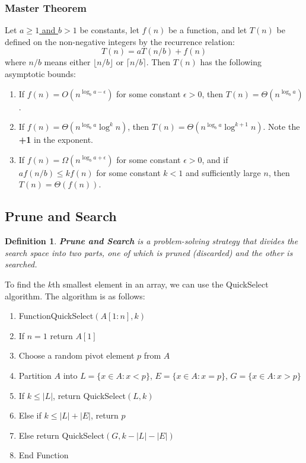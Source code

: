 \documentclass[conference]{IEEEtran}
\newtheorem*{definition}{Definition}
\begin{document}
\subsubsection{Master Theorem}
Let \underline{$a \geq 1$ and $b > 1$} be constants, let $f(n)$ be a function, and let $T(n)$ be defined on the non-negative integers by the recurrence relation: \[
    T(n) = aT(n/b) + f(n)
\]
where $n/b$ means either $\lfloor n/b \rfloor$ or $\lceil n/b \rceil$. Then $T(n)$ has the following asymptotic bounds: \begin{enumerate}
    \item If $f(n) = O(n^{\log_b a - \epsilon})$ for some constant $\epsilon > 0$, then $T(n) = \Theta(n^{\log_b a})$.
    \item If $f(n) = \Theta(n^{\log_b a} \log^k n)$, then $T(n) = \Theta(n^{\log_b a} \log^{k+1} n)$. Note the \textbf{+1} in the exponent.
    \item If $f(n) = \Omega(n^{\log_b a + \epsilon})$ for some constant $\epsilon > 0$, and if $a f(n/b) \leq k f(n)$ for some constant $k < 1$ and sufficiently large $n$, then $T(n) = \Theta(f(n))$.
\end{enumerate}

\subsection{Prune and Search}

\begin{definition}
    \textbf{Prune and Search} is a problem-solving strategy that divides the search space into two parts, one of which is pruned (discarded) and the other is searched.
\end{definition}

To find the $k$th smallest element in an array, we can use the QuickSelect algorithm. The algorithm is as follows:
\begin{enumerate}
    \item Function{QuickSelect}{$(A[1:n], k)$}
    \item If $n = 1$ return $A[1]$
    \item Choose a random pivot element $p$ from $A$
    \item Partition $A$ into $L = \{x \in A : x < p\}$, $E = \{x \in A : x = p\}$, $G = \{x \in A : x > p\}$
    \item If $k \leq |L|$, return QuickSelect$(L, k)$
    \item Else if $k \leq |L| + |E|$, return $p$
    \item Else return QuickSelect$(G, k - |L| - |E|)$
    \item End Function
\end{enumerate}
\end{document}
